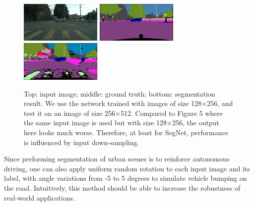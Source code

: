 \documentclass[10pt,twocolumn,letterpaper]{article}
\begin{document}
\begin{figure}[h]
	\centering
	\includegraphics[width=0.35\textwidth]{bad_case.png}
	\includegraphics[width=0.35\textwidth]{bad_case_gt.png}
	\includegraphics[width=0.35\textwidth]{bad_case_seg.png}
	\caption{Top: input image; middle: ground truth; bottom: segmentation result. We use the network trained with images of size 128$\times$256, and test it on an image of size 256$\times$512. Compared to Figure 5 where the same input image is used but with size 128$\times$256, the output here looks much worse. Therefore, at least for SegNet, performance is influenced by input down-sampling.}
	\label{fig:figure5}
\end{figure}

Since performing segmentation of urban scenes is to reinforce autonomous driving, one can also apply uniform random rotation to each input image and its label, with angle variations from -5 to 5 degrees to simulate vehicle bumping on the road. Intuitively, this method should be able to increase the robustness of real-world applications.


{\small


}
\end{document}
